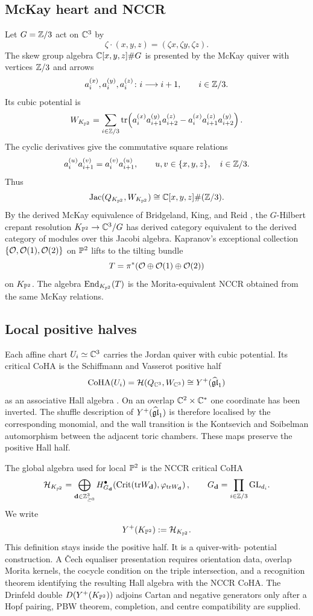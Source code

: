 \subsection*{McKay heart and NCCR}

Let $G=\Z/3$ act on $\C^3$ by
\[
 \zeta\cdot(x,y,z)=(\zeta x,\zeta y,\zeta z).
\]
The skew group algebra $\C[x,y,z]\#G$ is presented by the McKay quiver
with vertices $\Z/3$ and arrows
\[
 a_i^{(x)},a_i^{(y)},a_i^{(z)}\colon i\longrightarrow i+1,
 \qquad i\in\Z/3.
\]
Its cubic potential is
\[
 W_{K_{\P^2}}
 =\sum_{i\in\Z/3}\tr\!\left(
 a_i^{(x)}a_{i+1}^{(y)}a_{i+2}^{(z)}
 -a_i^{(x)}a_{i+1}^{(z)}a_{i+2}^{(y)}
 \right).
\]
The cyclic derivatives give the commutative square relations
\[
 a_i^{(u)}a_{i+1}^{(v)}=a_i^{(v)}a_{i+1}^{(u)},
 \qquad u,v\in\{x,y,z\},\quad i\in\Z/3.
\]
Thus
\[
 \mathrm{Jac}(Q_{K_{\P^2}},W_{K_{\P^2}})
 \cong \C[x,y,z]\#(\Z/3).
\]
By the derived McKay equivalence of Bridgeland, King, and Reid
\cite{BridgelandKingReid2001}, the $G$-Hilbert crepant resolution
$K_{\P^2}\to\C^3/G$ has derived category equivalent to the derived
category of modules over this Jacobi algebra. Kapranov's exceptional
collection $\{\cO,\cO(1),\cO(2)\}$ on $\P^2$ \cite{Kapranov1988} lifts
to the tilting bundle
\[
 T=\pi^*(\cO\oplus\cO(1)\oplus\cO(2))
\]
on $K_{\P^2}$. The algebra $\mathrm{End}_{K_{\P^2}}(T)$ is the
Morita-equivalent NCCR obtained from the same McKay relations.

\subsection*{Local positive halves}

Each affine chart $U_i\simeq\C^3$ carries the Jordan quiver with cubic
potential. Its critical CoHA is the Schiffmann and Vasserot positive
half
\[
 \CoHA(U_i)=\cH(Q_{\C^3},W_{\C^3})
 \cong Y^+(\widehat{\fgl}_1)
\]
as an associative Hall algebra \cite{SV2013}. On an overlap
$\C^2\times\C^*$ one coordinate has been inverted. The shuffle
description of $Y^+(\widehat{\fgl}_1)$ is therefore localised by the
corresponding monomial, and the wall transition is the
Kontsevich and Soibelman automorphism between the adjacent toric
chambers. These maps preserve the positive Hall half.

The global algebra used for local $\P^2$ is the NCCR critical CoHA
\[
 \cH_{K_{\P^2}}
 =
 \bigoplus_{\mathbf d\in\Z_{\geq0}^3}
 H^\bullet_{G_{\mathbf d}}\!
 \left(\Crit(\tr W_{\mathbf d}),\varphi_{\tr W_{\mathbf d}}\right),
 \qquad
 G_{\mathbf d}=\prod_{i\in\Z/3}\mathrm{GL}_{d_i}.
\]
We write
\[
 Y^+(K_{\P^2}) := \cH_{K_{\P^2}}.
\]
This definition stays inside the positive half. It is a quiver-with-
potential construction. A \v{C}ech equaliser presentation requires
orientation data, overlap Morita kernels, the cocycle condition on the
triple intersection, and a recognition theorem identifying the resulting
Hall algebra with the NCCR CoHA. The Drinfeld double
$D(Y^+(K_{\P^2}))$ adjoins Cartan and negative generators only after a
Hopf pairing, PBW theorem, completion, and centre compatibility are
supplied.

